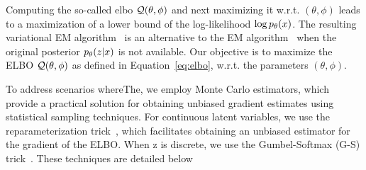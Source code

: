 Computing the so-called \gls*{elbo}
$\mathcal{Q}(\theta,\phi)$ and next
maximizing it w.r.t. $(\theta,\phi)$ leads to a maximization of a lower bound of
the log-likelihood $\log p_{\theta}(x)$. The resulting variational EM 
algorithm~\citep{variational-EM} is an alternative to the 
EM algorithm~\citep{dempster1977maximum}
when the original posterior $p_{\theta}(z|x)$ is not available. 
\label{subsec:optimization_vae}
Our objective is to maximize the ELBO $\mathcal{Q}(\theta,\phi)$  as defined in
Equation~\eqref{eq:elbo}, 
w.r.t. the parameters $(\theta, \phi)$.


To address scenarios whereThe, we
employ Monte Carlo estimators, which provide a practical solution for obtaining
unbiased gradient estimates using statistical sampling techniques. For
continuous latent variables, we use the reparameterization trick~\citep{kingma2014}, 
which facilitates obtaining an unbiased estimator for the gradient of the ELBO.
 When z is discrete, we
use the Gumbel-Softmax (G-S) trick~\citep{maddison2016concrete,
jang2016categorical}.
These techniques are detailed below

